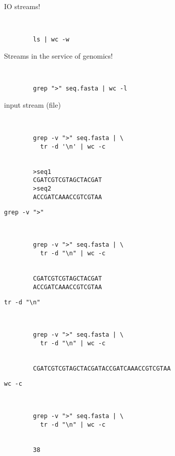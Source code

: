 \documentclass[xcolor=dvipsnames]{beamer}
\begin{document}
\begin{frame}[fragile]
	\huge
	IO streams!
	\Large
	\begin{verbatim}


		ls | wc -w
	\end{verbatim}
\end{frame}

\begin{frame}[fragile]
	\huge
	Streams in the service of genomics!
	\Large
	\begin{verbatim}


		grep ">" seq.fasta | wc -l
	\end{verbatim}
\end{frame}

\begin{frame}[fragile]
	\huge
	input stream (file)
	\Large
	\begin{verbatim}


		grep -v ">" seq.fasta | \
		  tr -d '\n' | wc -c


		>seq1
		CGATCGTCGTAGCTACGAT
		>seq2
		ACCGATCAAACCGTCGTAA
	\end{verbatim}
\end{frame}

\begin{frame}[fragile]
	\huge
	\verb!grep -v ">"!
	\Large
	\begin{verbatim}


		grep -v ">" seq.fasta | \
		  tr -d "\n" | wc -c


		CGATCGTCGTAGCTACGAT
		ACCGATCAAACCGTCGTAA
	\end{verbatim}
\end{frame}

\begin{frame}[fragile]
	\huge
	\verb!tr -d "\n"!
	\Large
	\begin{verbatim}


		grep -v ">" seq.fasta | \
		  tr -d "\n" | wc -c


		CGATCGTCGTAGCTACGATACCGATCAAACCGTCGTAA
	\end{verbatim}
\end{frame}

\begin{frame}[fragile]
	\huge
	\verb!wc -c!
	\Large
	\begin{verbatim}


		grep -v ">" seq.fasta | \
		  tr -d "\n" | wc -c


		38
	\end{verbatim}
\end{frame}
\end{document}
